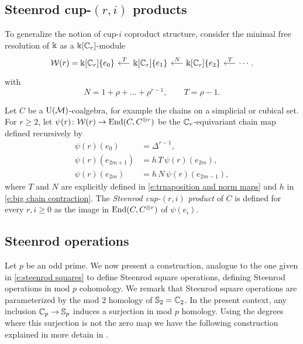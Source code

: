 \subsection{Steenrod cup-$(r,i)$ products} \label{ss:cup-(p,i) coproducts}

To generalize the notion of cup-$i$ coproduct structure, consider the minimal free resolution of $\Bbbk$ as a $\Bbbk[\mathbb{C}_r]$-module
\begin{equation} \label{e:minimal resolution r>2}
\begin{tikzcd} [column sep = .5cm]
\mathcal W(r) = \k[\Cyc_r]\{e_0\} & \arrow[l, "\,T"'] \k[\Cyc_r]\{e_1\} & \arrow[l, "\,N"'] \k[\Cyc_r]\{e_2\} & \arrow[l, "\,T"'] \cdots.
\end{tikzcd}
\end{equation}
with
\begin{equation} \label{e:trnaposition and norm maps}
N = 1 + \rho + \dots + \rho^{r-1}, \qquad
T = \rho - 1.
\end{equation}

Let $C$ be a ${\operatorname{U}(\mathcal{M})}$-coalgebra, for example the chains on a simplicial or cubical set.
For $r \geq 2$, let $\psi(r) \colon \mathcal{W}(r) \to \mathrm{End}(C, C^{\otimes r})$ be the $\mathbb{C}_r$-equivariant chain map defined recursively by
\begin{equation}\label{e:definition of psi}
\begin{split}
\psi(r)(e_0) & = \Delta^{r-1}, \\
\psi(r)(e_{2m+1}) & = h\,T\,\psi(r)(e_{2m}), \\
\psi(r)(e_{2m}) & = h\,N\,\psi(r)(e_{2m-1}),
\end{split}
\end{equation}
where $T$ and $N$ are explicitly defined in \eqref{e:trnaposition and norm maps} and $h$ in \eqref{e:big chain contraction}.
The \textit{Steenrod cup-}$(r, i)$ \textit{product} of $C$ is defined for every $r, i \geq 0$ as the image in $\mathrm{End}(C, C^{\otimes r})$ of $\psi(e_i)$.

\subsection{Steenrod operations} \label{ss:steenrod operations}

Let $p$ be an odd prime.
We now present a construction, analogue to the one given in \eqref{e:steenrod squares} to define Steenrod square operations, defining Steenrod operations in mod $p$ cohomology.
We remark that Steenrod square operations are parameterized by the mod $2$ homology of $\mathbb{S}_2 = \mathbb{C}_2$.
In the present context, any inclusion $\mathbb{C}_p \to \mathbb{S}_p$ induces a surjection in mod $p$ homology.
Using the degrees where this surjection is not the zero map we have the following construction explained in more detain in \cite{steenrod1952reduced,steenrod1953cyclic,may1970general}.

